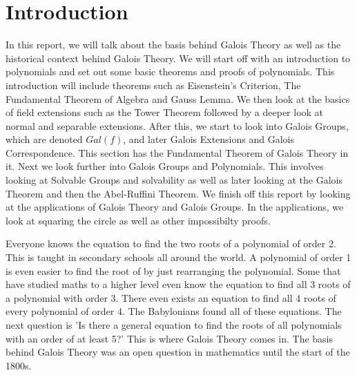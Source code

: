 \section{Introduction}

In this report, we will talk about the basis behind Galois Theory as well as the historical context behind Galois Theory. We will start off with an introduction to polynomials and set out some basic theorems and proofs of polynomials. This introduction will include theorems such as Eisenstein's Criterion, The Fundamental Theorem of Algebra and Gauss Lemma. We then look at the basics of field extensions such as the Tower Theorem followed by a deeper look at normal and separable extensions. After this, we start to look into Galois Groups, which are denoted $Gal(f)$, and later Galois Extensions and Galois Correspondence. This section has the Fundamental Theorem of Galois Theory in it. Next we look further into Galois Groups and Polynomials. This involves looking at Solvable Groups and solvability as well as later looking at the Galois Theorem and then the Abel-Ruffini Theorem. We finish off this report by looking at the applications of Galois Theory and Galois Groups. In the applications, we look at squaring the circle as well as other impossibilty proofs.

Everyone knows the equation to find the two roots of a polynomial of order 2. This is taught in secondary schools all around the world. A polynomial of order 1 is even easier to find the root of by just rearranging the polynomial. Some that have studied maths to a higher level even know the equation to find all 3 roots of a polynomial with order 3. There even exists an equation to find all 4 roots of every polynomial of order 4. The Babylonians found all of these equations. The next question is 'Is there a general equation to find the roots of all polynomials with an order of at least 5?' This is where Galois Theory comes in. The basis behind Galois Theory was an open question in mathematics until the start of the 1800s.

